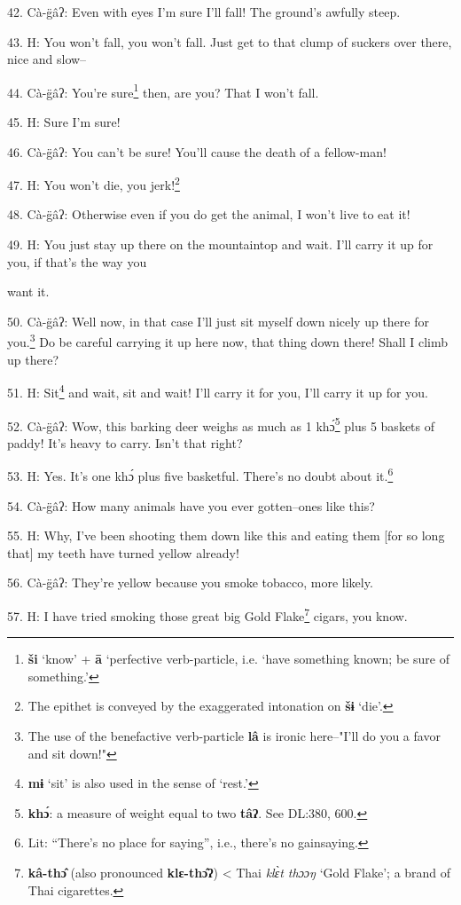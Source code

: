 42. Cà-g̈âʔ: Even with eyes I'm sure I'll fall! The ground's awfully steep.

43. H: You won't fall, you won't fall. Just get to that clump of suckers over there,
nice and slow--

44. Cà-g̈âʔ: You're sure\footnote{\textbf{ši} `know' + \textbf{ā} `perfective verb-particle, i.e. `have something known; be sure of something.'} then, are you? That I won't fall.

45. H: Sure I'm sure!

46. Cà-g̈âʔ: You can't be sure! You'll cause the death of a fellow-man!

47. H: You won't die, you jerk!\footnote{The epithet is conveyed by the exaggerated intonation on \textbf{šɨ} `die'.}

48. Cà-g̈âʔ: Otherwise even if you do get the animal, I won't live to eat it!

49. H: You just stay up there on the mountaintop and wait. I'll carry it up for
you, if that's the way you

want it.

50. Cà-g̈âʔ: Well now, in that case I'll just sit myself down nicely up there
for you.\footnote{The use of the benefactive verb-particle \textbf{lâ} is ironic here--"I'll do you a favor and sit down!"} Do be careful carrying it up here now, that thing down there! Shall
I climb up there?

51. H: Sit\footnote{\textbf{mɨ} `sit' is also used in the sense of `rest.'} and wait, sit and wait! I'll carry it for you, I'll carry it up
for you.


52. Cà-g̈âʔ: Wow, this barking deer weighs as much as 1 khɔ́\footnote{\textbf{khɔ́}: a measure of weight equal to two \textbf{tâʔ}. See DL:380, 600.} plus 5
baskets of paddy! It's heavy to carry. Isn't that right?

53. H: Yes. It's one khɔ́ plus five basketful. There's no doubt about it.\footnote{Lit: ``There's no place for saying'', i.e., there's no gainsaying.}

54. Cà-g̈âʔ: How many animals have you ever gotten--ones like this?

55. H: Why, I've been shooting them down like this and eating them [for so long
that] my teeth have turned yellow already!

56. Cà-g̈âʔ: They're yellow because you smoke tobacco, more likely.

57. H: I have tried smoking those great big Gold Flake\footnote{\textbf{kâ-thɔ̂} (also pronounced \textbf{klɛ-thɔ̂ʔ}) < Thai\textit{ klɛ̀t thɔɔŋ} `Gold Flake'; a brand of Thai cigarettes.} cigars, you know.

